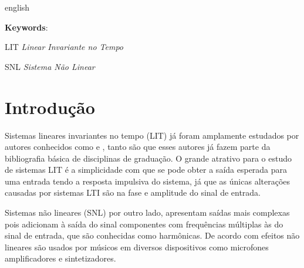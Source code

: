 \begin{resumo}[Abstract]
 \begin{otherlanguage*}{english}
	
   \vspace{\onelineskip}
   \noindent 
   \textbf{Keywords}:
 \end{otherlanguage*}
\end{resumo}


\listoffigures*
\cleardoublepage

\listoftables*
\cleardoublepage

\begin{siglas}
	\item[LIT]		\emph{Linear Invariante no Tempo}
	\item[SNL]		\emph{Sistema Não Linear}

\end{siglas}

\tableofcontents*
\cleardoublepage

\textual
	\chapter{Introdução}

Sistemas lineares invariantes no tempo (LIT) já foram amplamente estudados por autores conhecidos como  e  , tanto são que esses autores já fazem parte da bibliografia básica de disciplinas de graduação. O grande atrativo para o estudo de sistemas LIT é a simplicidade com que se pode obter a saída esperada para uma entrada tendo a resposta impulsiva do sistema, já que as únicas alterações causadas por sistemas LTI são na fase e amplitude do sinal de entrada.

Sistemas não lineares (SNL) por outro lado, apresentam saídas mais complexas pois adicionam à saída do sinal componentes com frequências múltiplas às do sinal de entrada, que são conhecidas como harmônicas. De acordo com  efeitos não lineares são usados por músicos em diversos dispositivos como microfones amplificadores e sintetizadores.

